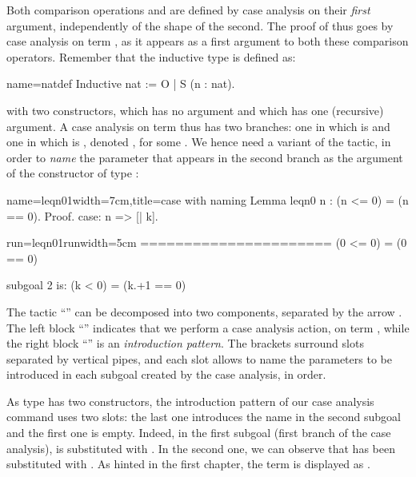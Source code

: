 Both comparison operations \C{<=} and \C{==} are defined by case
analysis on their \emph{first} argument, independently of the shape of
the second. The proof of  thus goes by case analysis on
 term , as it appears as a first argument to
both these comparison operators.  Remember that the inductive type  is
defined as:

\begin{coq}{name=natdef}{}
Inductive nat := O | S (n : nat).
\end{coq}
with two constructors,  which has no argument and  which has
one (recursive) argument. A case analysis on term  thus
has two branches: one in which  is  and one in which  is
, denoted , for some . We hence need a
variant of the  tactic, in order to \emph{name} the parameter
 that appears in the second branch as the argument of the 
constructor of type :

\begin{coq-left}{name=leqn01}{width=7cm,title=case with naming}
Lemma leqn0 n : (n <= 0) = (n == 0).
Proof.
case: n => [| k].
$~$
$~$
\end{coq-left}
\begin{coqout-right}{run=leqn01run}{width=5cm}
======================
  (0 <= 0) = (0 == 0)

subgoal 2 is:
 (k < 0) = (k.+1 == 0)
\end{coqout-right}

The tactic ``''  can be decomposed into two components,
separated by the arrow \C{=>}.  The left block ``'' indicates
that we  perform a case analysis action, on term , while the right
block ``\C{[|k]}'' is an \emph{introduction pattern}. The brackets
surround slots separated by vertical pipes, and each slot allows to
name the parameters to be introduced in each subgoal created by the
case analysis, in order.

As type  has two constructors, the introduction pattern \C{[|k]}
of our case analysis command uses two slots: the last one introduces
the name  in the second subgoal and the first one is
empty. Indeed, in the first subgoal (first branch of the case
analysis),  is substituted with . In the second one, we can
observe that  has been substituted with .
As hinted in the first chapter, the term 
is displayed as .


